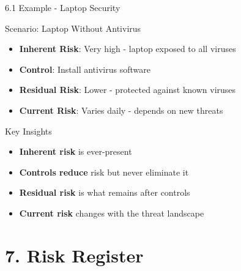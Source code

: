 \documentclass[9pt]{beamer}  %
\begin{document}
	\begin{frame}{6.1 Example - Laptop Security}
		\begin{block}{Scenario: Laptop Without Antivirus}
			\begin{itemize}
				\item \textbf{Inherent Risk}: Very high - laptop exposed to all viruses
				\item \textbf{Control}: Install antivirus software
				\item \textbf{Residual Risk}: Lower - protected against known viruses
				\item \textbf{Current Risk}: Varies daily - depends on new threats
			\end{itemize}
		\end{block}
		
		\begin{block}{Key Insights}
			\begin{itemize}
				\item \textbf{Inherent risk} is ever-present
				\item \textbf{Controls reduce} risk but never eliminate it
				\item \textbf{Residual risk} is what remains after controls
				\item \textbf{Current risk} changes with the threat landscape
			\end{itemize}
		\end{block}
	\end{frame}
	
	\section{7. Risk Register}
	
\end{document}
